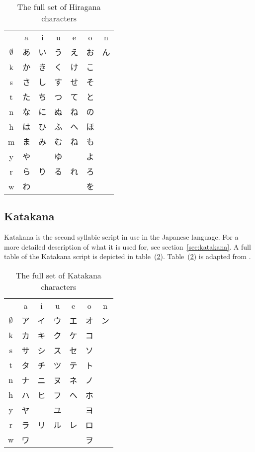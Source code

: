 \begin{table}[htbp]
\begin{CJK}
  \begin{tabular}{c c c c c c c}
 &a&i&u&e&o&n\\
$\emptyset$&あ&い&う&え&お&ん\\
k&か&き&く&け&こ&\\
s&さ&し&す&せ&そ&\\
t&た&ち&つ&て&と&\\
n&な&に&ぬ&ね&の&\\
h&は&ひ&ふ&へ&ほ&\\
m&ま&み&む&ね&も&\\
y&や& &ゆ& &よ&\\
r&ら&り&る&れ&ろ&\\
w&わ& & & &を&\\
  \end{tabular}
\end{CJK}
\caption{The full set of Hiragana characters}
\label{table:fullhiragana}
\end{table}

\subsection{Katakana }
\label{sec:app:katakana}

Katakana is the second syllabic script in use in the Japanese language. 
For a more detailed description of what it is used for, see 
section~\ref{sec:katakana}.
A full table of the Katakana script is depicted in 
table~(\ref{table:fullkatakana}).
Table~(\ref{table:fullkatakana}) is adapted from .

\begin{table}[htbp]
\begin{CJK}
  \begin{tabular}{c c c c c c c}
 &a&i&u&e&o&n\\
$\emptyset$&ア&イ&ウ&エ&オ&ン\\
k&カ&キ&ク&ケ&コ&\\
s&サ&シ&ス&セ&ソ&\\
t&タ&チ&ツ&テ&ト&\\
n&ナ&ニ&ヌ&ネ&ノ&\\
h&ハ&ヒ&フ&ヘ&ホ&\\
y&ヤ&　&ユ&　&ヨ&\\
r&ラ&リ&ル&レ&ロ&\\
w&ワ&　&　&　&ヲ&\\
  \end{tabular}
\end{CJK}
\caption{The full set of Katakana characters}
\label{table:fullkatakana}
\end{table}



